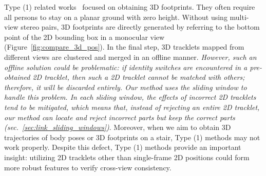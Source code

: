 \documentclass{CVM}
\begin{document}
\tabcolsep=4pt
\begin{table}[!h]
\centering
\caption{\textbf{Comparison of Related Works and Our Proposal.} Where ``Bboxes'' represents 2D bounding boxes.}
\label{tab:related_works}
  \end{table}


 

  
  Type (1) related works~\cite{sternig2011multi,wen2017multi,kohl2020mta,he2020multi} focused on obtaining 3D footprints. They often require all persons to stay on a planar ground with zero height. Without using multi-view stereo pairs, 3D footprints are directly generated by referring to the bottom point of the 2D bounding box in a monocular view (Figure~\ref{fig:compare_3d_pos}). In the final step, 3D tracklets mapped from different views are clustered and merged in an offline manner. \textit{However, such an offline solution could be problematic: if identity switches are encountered in a pre-obtained 2D tracklet, then such a 2D tracklet cannot be matched with others; therefore, it will be discarded entirely. Our method uses the sliding window to handle this problem. In each sliding window, the effects of incorrect 2D tracklets tend to be mitigated, which means that, instead of rejecting an entire 2D tracklet, our method can locate and reject incorrect parts but keep the correct parts (\textit{sec.}~\ref{sec:link_sliding_windows})}. Moreover, when we aim to obtain 3D trajectories of body poses or 3D footprints on a stair, Type (1) methods may not work properly. Despite this defect, Type (1) methods provide an important insight: utilizing 2D tracklets other than single-frame 2D positions could form more robust features to verify cross-view consistency.
  
\end{document}

